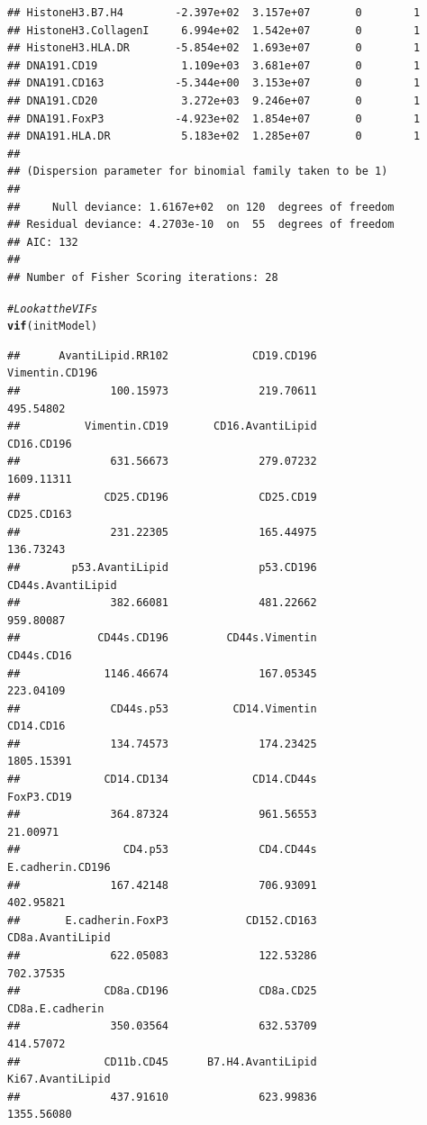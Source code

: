 \documentclass[a4paper]{article}\usepackage[]{graphicx}\usepackage[]{color}
\makeatletter
\newcommand{\hlcom}[1]{\textcolor[rgb]{0.678,0.584,0.686}{\textit{#1}}}%
\newcommand{\hlstd}[1]{\textcolor[rgb]{0.345,0.345,0.345}{#1}}%
\newcommand{\hlkwd}[1]{\textcolor[rgb]{0.737,0.353,0.396}{\textbf{#1}}}%
\newenvironment{kframe}{%
 \def\at@end@of@kframe{}%
 \ifinner\ifhmode%
  \def\at@end@of@kframe{\end{minipage}}%
  \begin{minipage}{\columnwidth}%
 \fi\fi%
 \def\FrameCommand##1{\hskip\@totalleftmargin \hskip-\fboxsep
 \colorbox{shadecolor}{##1}\hskip-\fboxsep
     \hskip-\linewidth \hskip-\@totalleftmargin \hskip\columnwidth}%
 \MakeFramed {\advance\hsize-\width
   \@totalleftmargin\z@ \linewidth\hsize
   \@setminipage}}%
 {\par\unskip\endMakeFramed%
 \at@end@of@kframe}
\newenvironment{knitrout}{}{} %
\makeatother
\begin{document}
\begin{knitrout}
\begin{kframe}
\begin{verbatim}
## HistoneH3.B7.H4        -2.397e+02  3.157e+07       0        1
## HistoneH3.CollagenI     6.994e+02  1.542e+07       0        1
## HistoneH3.HLA.DR       -5.854e+02  1.693e+07       0        1
## DNA191.CD19             1.109e+03  3.681e+07       0        1
## DNA191.CD163           -5.344e+00  3.153e+07       0        1
## DNA191.CD20             3.272e+03  9.246e+07       0        1
## DNA191.FoxP3           -4.923e+02  1.854e+07       0        1
## DNA191.HLA.DR           5.183e+02  1.285e+07       0        1
## 
## (Dispersion parameter for binomial family taken to be 1)
## 
##     Null deviance: 1.6167e+02  on 120  degrees of freedom
## Residual deviance: 4.2703e-10  on  55  degrees of freedom
## AIC: 132
## 
## Number of Fisher Scoring iterations: 28
\end{verbatim}
\begin{alltt}
\hlcom{# Look at the VIFs}
\hlkwd{vif}\hlstd{(initModel)}
\end{alltt}
\begin{verbatim}
##      AvantiLipid.RR102             CD19.CD196         Vimentin.CD196 
##              100.15973              219.70611              495.54802 
##          Vimentin.CD19       CD16.AvantiLipid             CD16.CD196 
##              631.56673              279.07232             1609.11311 
##             CD25.CD196              CD25.CD19             CD25.CD163 
##              231.22305              165.44975              136.73243 
##        p53.AvantiLipid              p53.CD196      CD44s.AvantiLipid 
##              382.66081              481.22662              959.80087 
##            CD44s.CD196         CD44s.Vimentin             CD44s.CD16 
##             1146.46674              167.05345              223.04109 
##              CD44s.p53          CD14.Vimentin              CD14.CD16 
##              134.74573              174.23425             1805.15391 
##             CD14.CD134             CD14.CD44s             FoxP3.CD19 
##              364.87324              961.56553               21.00971 
##                CD4.p53              CD4.CD44s       E.cadherin.CD196 
##              167.42148              706.93091              402.95821 
##       E.cadherin.FoxP3            CD152.CD163       CD8a.AvantiLipid 
##              622.05083              122.53286              702.37535 
##             CD8a.CD196              CD8a.CD25        CD8a.E.cadherin 
##              350.03564              632.53709              414.57072 
##             CD11b.CD45      B7.H4.AvantiLipid       Ki67.AvantiLipid 
##              437.91610              623.99836             1355.56080 

\end{verbatim}
\end{kframe}
\end{knitrout}
\end{document}
